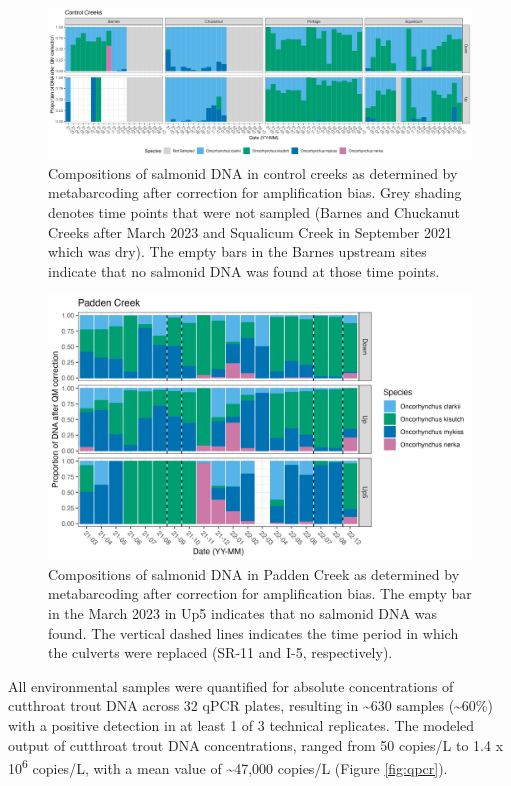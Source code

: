 \documentclass[
]{article}
\begin{document}
\begin{figure}
\centering
\includegraphics{../Output/Figures/proportions_after_qm_nopadden.png}
\caption{Compositions of salmonid DNA in control creeks as determined by
metabarcoding after correction for amplification bias. Grey shading
denotes time points that were not sampled (Barnes and Chuckanut Creeks
after March 2023 and Squalicum Creek in September 2021 which was dry).
The empty bars in the Barnes upstream sites indicate that no salmonid
DNA was found at those time points.\label{fig:qm_controls}}
\end{figure}

\begin{figure}
\centering
\includegraphics{../Output/Figures/proportions_after_qm_padden.png}
\caption{Compositions of salmonid DNA in Padden Creek as determined by
metabarcoding after correction for amplification bias. The empty bar in
the March 2023 in Up5 indicates that no salmonid DNA was found. The
vertical dashed lines indicates the time period in which the culverts
were replaced (SR-11 and I-5, respectively).\label{fig:qm_padden}}
\end{figure}

All environmental samples were quantified for absolute concentrations of
cutthroat trout DNA across 32 qPCR plates, resulting in
\textasciitilde630 samples (\textasciitilde60\%) with a positive
detection in at least 1 of 3 technical replicates. The modeled output of
cutthroat trout DNA concentrations, ranged from 50 copies/L to 1.4 x
10\textsuperscript{6} copies/L, with a mean value of
\textasciitilde47,000 copies/L (Figure \ref{fig:qpcr}).
\end{document}
